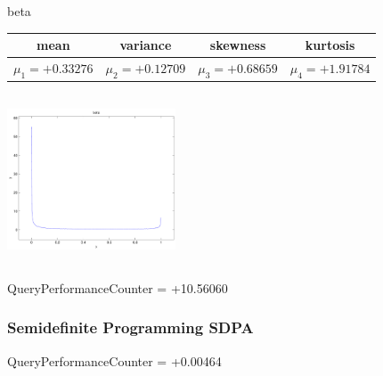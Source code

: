 \documentclass[9pt]{article}
\theoremstyle{plain}
\theoremstyle{definition}
\theoremstyle{remark}
\numberwithin{equation}{section}
\begin{document}
\newpage
beta \begin{tabular}{|c|c|c|c|}  mean & variance & skewness & kurtosis \\  \hline
$\mu_1 = +0.33276$ & $\mu_2 = +0.12709$ & $\mu_3 = +0.68659$ & $\mu_4 =+1.91784$ \\
\end{tabular}

\includegraphics[width=5cm,height=5cm]{beta.pdf}

QueryPerformanceCounter  =  +10.56060
\subsubsection{Semidefinite Programming SDPA}
QueryPerformanceCounter  =  +0.00464
\end{document}
